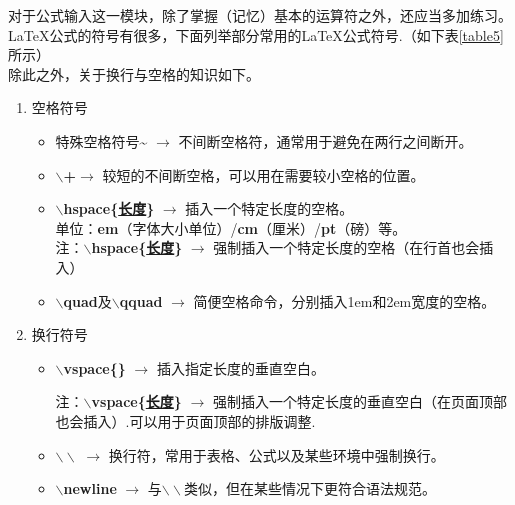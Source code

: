 \documentclass{article}
\begin{document}
			对于公式输入这一模块，除了掌握（记忆）基本的运算符之外，还应当多加练习。\LaTeX 公式的符号有很多，下面列举部分常用的\LaTeX 公式符号.（如下表\ref{table5}所示）\\
			除此之外，关于换行与空格的知识如下。
			\begin{enumerate}
				\item 空格符号
					\begin{itemize}
						\item 特殊空格符号\textbf{\~{}} $\to$ 不间断空格符，通常用于避免在两行之间断开。
						\item \textbf{$\backslash$+}$\to$ 较短的不间断空格，可以用在需要较小空格的位置。
						\item \textbf{$\backslash$hspace\{\underline{长度}\}} $\to$ 插入一个特定长度的空格。 \\
						单位：\textbf{em}{\small （字体大小单位）}/\textbf{cm}{\small （厘米）}/\textbf{pt}{\small （磅）}等。\\
						{\footnotesize *注：\textbf{$\backslash$hspace\textbf{{\large *}}\{\underline{长度}\}} $\to$ 强制插入一个特定长度的空格（在行首也会插入）}
						\item \textbf{$\backslash$quad}及\textbf{$\backslash$qquad} $\to$ 简便空格命令，分别插入1em和2em宽度的空格。
					\end{itemize}
				\item 换行符号
					\begin{itemize}
						\item \textbf{$\backslash$vspace\{\}} $\to$ 插入指定长度的垂直空白。
						\begin{center}
						\end{center}
						{\footnotesize *注：\textbf{$\backslash$vspace\textbf{{\large *}}\{\underline{长度}\}} $\to$ 强制插入一个特定长度的垂直空白（在页面顶部也会插入）.可以用于页面顶部的排版调整.}
						\item \textbf{$\backslash\backslash$} $\to$ 换行符，常用于表格、公式以及某些环境中强制换行。
						\item \textbf{$\backslash$newline} $\to$ 与$\backslash\backslash$类似，但在某些情况下更符合语法规范。
							\begin{center}

\end{center}
\end{itemize}
\end{enumerate}
\end{document}
